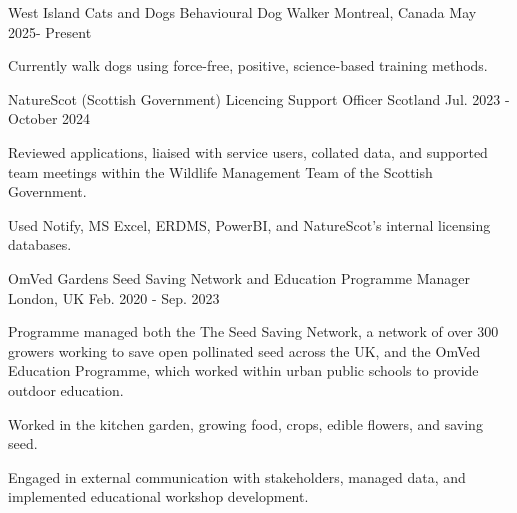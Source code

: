 \begin{cventries}
\cventry
 {West Island Cats and Dogs}
    {Behavioural Dog Walker}
    {Montreal, Canada}
    {May 2025- Present}
    {
      \begin{cvitems}
       \item Currently walk dogs using force-free, positive, science-based training methods. 
       \end{cvitems}
    }


\vspace{-2ex}
\cventry
 {NatureScot (Scottish Government)}
    {Licencing Support Officer}
    {Scotland}
    {Jul. 2023 - October 2024}
    {
      \begin{cvitems}
       \item Reviewed applications, liaised with service users, collated data, and supported team meetings within the Wildlife Management Team of the Scottish Government. 
       \item Used Notify, MS Excel, ERDMS, PowerBI, and NatureScot's internal licensing databases. 
       \end{cvitems}
    }


\vspace{-2ex}
\cventry
{OmVed Gardens}
{Seed Saving Network and Education Programme Manager}
{London, UK}
{Feb. 2020 - Sep. 2023}
{
  \begin{cvitems}
    \item Programme managed both the The Seed Saving Network, a network of over 300 growers working to save open pollinated seed across the UK, and the OmVed Education Programme, which worked within urban public schools to provide outdoor education. 
    \item Worked in the kitchen garden, growing food, crops, edible flowers, and saving seed. 
    \item Engaged in external communication with stakeholders, managed data, and implemented educational workshop development.
  \end{cvitems}
}



\end{cventries}
